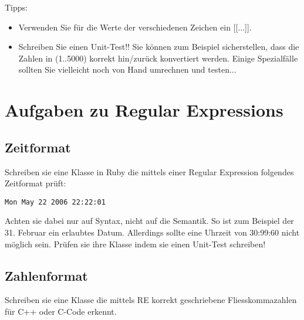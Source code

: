 \documentclass[a4paper,11pt,oneside]{scrbook}
\begin{document}
Tipps:
\begin{itemize}
	\item Verwenden Sie für die Werte der verschiedenen Zeichen ein [[...]].
	\item Schreiben Sie einen Unit-Test!! Sie können zum Beispiel sicherstellen, dass die Zahlen in (1..5000) korrekt hin/zurück konvertiert werden. Einige Spezialfälle sollten Sie vielleicht noch von Hand umrechnen und testen...
\end{itemize}























\chapter{Aufgaben zu Regular Expressions} %
\label{cha:aufgaben_zu_regular_expressions}

\section{Zeitformat} %
\label{sec:zeitformat}
Schreiben sie eine Klasse in Ruby die mittels einer Regular Expression folgendes Zeitformat prüft:

\begin{lstlisting}
Mon May 22 2006 22:22:01
\end{lstlisting}

Achten sie dabei nur auf Syntax, nicht auf die Semantik. So ist zum Beispiel der 31. Februar ein erlaubtes Datum. Allerdings sollte eine Uhrzeit von 30:99:60 nicht möglich sein.
Prüfen sie ihre Klasse indem sie einen Unit-Test schreiben!

\section{Zahlenformat} %
\label{sec:zahlenformat}
Schreiben sie eine Klasse die mittels RE korrekt geschriebene Fliesskommazahlen für C++ oder C-Code erkennt.
\end{document}
